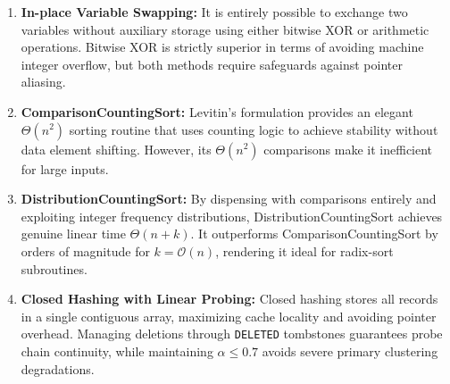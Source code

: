\documentclass[12pt,a4paper]{article}
\theoremstyle{plain}
\theoremstyle{definition}
\theoremstyle{remark}
\begin{document}
\begin{enumerate}[leftmargin=2em, label=\textbf{\arabic*.}]
  \item \textbf{In-place Variable Swapping:} It is entirely possible to exchange two variables without auxiliary storage using either bitwise XOR or arithmetic operations. Bitwise XOR is strictly superior in terms of avoiding machine integer overflow, but both methods require safeguards against pointer aliasing.
  \item \textbf{ComparisonCountingSort:} Levitin's formulation provides an elegant $\Theta(n^2)$ sorting routine that uses counting logic to achieve stability without data element shifting. However, its $\Theta(n^2)$ comparisons make it inefficient for large inputs.
  \item \textbf{DistributionCountingSort:} By dispensing with comparisons entirely and exploiting integer frequency distributions, DistributionCountingSort achieves genuine linear time $\Theta(n + k)$. It outperforms ComparisonCountingSort by orders of magnitude for $k = \mathcal{O}(n)$, rendering it ideal for radix-sort subroutines.
  \item \textbf{Closed Hashing with Linear Probing:} Closed hashing stores all records in a single contiguous array, maximizing cache locality and avoiding pointer overhead. Managing deletions through \texttt{DELETED} tombstones guarantees probe chain continuity, while maintaining $\alpha \le 0.7$ avoids severe primary clustering degradations.
\end{enumerate}
\end{document}

